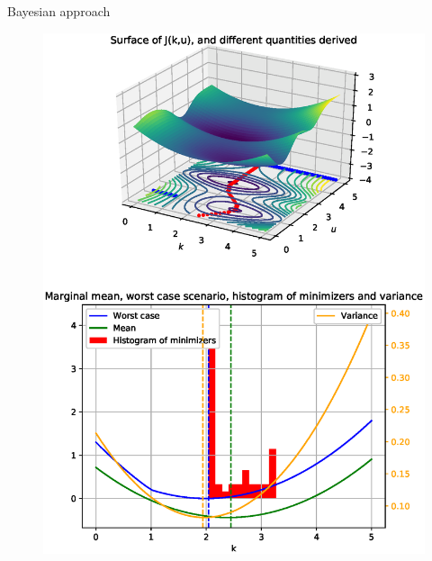 \documentclass{beamer}
\newlength{\thirdcolwid}
\newcommand{\Ex}{\mathbb{E}}
\DeclareMathOperator*{\argmax}{arg\,max}
\newcommand{\yobs}{\bm{y}^{\mathrm{obs}}}
\begin{document}
\begin{frame}[t]
\begin{columns}[t]
\begin{column}{\thirdcolwid}
\begin{block}{Bayesian approach}


    \begin{figure}[!h]
      \centering
      \includegraphics[width = \linewidth]{Surface}
    \end{figure}
  \end{block}


\end{column}
\end{columns}
\end{frame}
\end{document}
